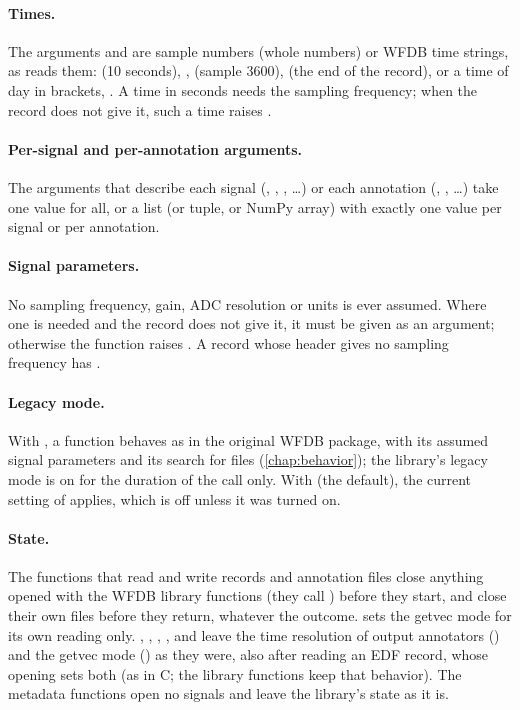 \paragraph{Times.} The arguments  and  are sample numbers
(whole numbers) or WFDB time strings, as  reads them:  (10
seconds), ,  (sample 3600),  (the end of the
record), or a time of day in brackets, . A time in seconds needs the
sampling frequency; when the record does not give it, such a time raises
.

\paragraph{Per-signal and per-annotation arguments.} The arguments that describe each
signal (, , , \ldots) or each annotation
(, , \ldots) take one value for all, or a list (or tuple, or
NumPy array) with exactly one value per signal or per annotation.

\paragraph{Signal parameters.} No sampling frequency, gain, ADC resolution or units is
ever assumed. Where one is needed and the record does not give it, it must be given as an
argument; otherwise the function raises . A record whose header gives no
sampling frequency has .

\paragraph{Legacy mode.} With , a function behaves as in the original
WFDB package, with its assumed signal parameters and its search for files
(\cref{chap:behavior}); the library's legacy mode is on for the duration of the call
only. With  (the default), the current setting of
 applies, which is off unless it was turned on.

\paragraph{State.} The functions that read and write records and annotation files close
anything opened with the WFDB library functions (they call ) before
they start, and close their own files before they return, whatever the outcome.
 sets the getvec mode for its own reading only. ,
, , ,
 and  leave the time resolution of output
annotators () and the getvec mode () as they were, also
after reading an EDF record, whose opening sets both (as in C; the library functions keep
that behavior). The metadata functions open no signals and leave the library's state as
it is.


